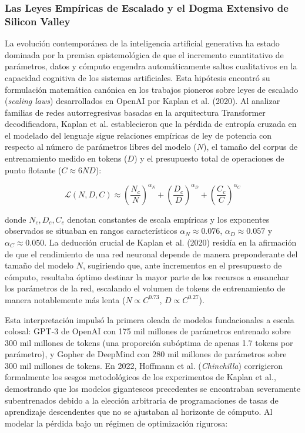 \subsubsection{Las Leyes Empíricas de Escalado y el Dogma Extensivo de Silicon Valley}

La evolución contemporánea de la inteligencia artificial generativa ha estado dominada por la premisa epistemológica de que el incremento cuantitativo de parámetros, datos y cómputo engendra automáticamente saltos cualitativos en la capacidad cognitiva de los sistemas artificiales. Esta hipótesis encontró su formulación matemática canónica en los trabajos pioneros sobre leyes de escalado (\textit{scaling laws}) desarrollados en OpenAI por Kaplan et al. (2020). Al analizar familias de redes autorregresivas basadas en la arquitectura Transformer decodificadora, Kaplan et al. establecieron que la pérdida de entropía cruzada en el modelado del lenguaje sigue relaciones empíricas de ley de potencia con respecto al número de parámetros libres del modelo ($N$), el tamaño del corpus de entrenamiento medido en tokens ($D$) y el presupuesto total de operaciones de punto flotante ($C \approx 6ND$):

\begin{equation}
\mathcal{L}(N, D, C) \approx \left(\frac{N_c}{N}\right)^{\alpha_N} + \left(\frac{D_c}{D}\right)^{\alpha_D} + \left(\frac{C_c}{C}\right)^{\alpha_C}
\end{equation}

donde $N_c, D_c, C_c$ denotan constantes de escala empíricas y los exponentes observados se situaban en rangos característicos $\alpha_N \approx 0.076$, $\alpha_D \approx 0.057$ y $\alpha_C \approx 0.050$. La deducción crucial de Kaplan et al. (2020) residía en la afirmación de que el rendimiento de una red neuronal depende de manera preponderante del tamaño del modelo $N$, sugiriendo que, ante incrementos en el presupuesto de cómputo, resultaba óptimo destinar la mayor parte de los recursos a ensanchar los parámetros de la red, escalando el volumen de tokens de entrenamiento de manera notablemente más lenta ($N \propto C^{0.73}$, $D \propto C^{0.27}$).

Esta interpretación impulsó la primera oleada de modelos fundacionales a escala colosal: GPT-3 de OpenAI con 175 mil millones de parámetros entrenado sobre 300 mil millones de tokens (una proporción subóptima de apenas 1.7 tokens por parámetro), y Gopher de DeepMind con 280 mil millones de parámetros sobre 300 mil millones de tokens. En 2022, Hoffmann et al. (\textit{Chinchilla}) corrigieron formalmente los sesgos metodológicos de los experimentos de Kaplan et al., demostrando que los modelos gigantescos precedentes se encontraban severamente subentrenados debido a la elección arbitraria de programaciones de tasas de aprendizaje descendentes que no se ajustaban al horizonte de cómputo. Al modelar la pérdida bajo un régimen de optimización rigurosa:

